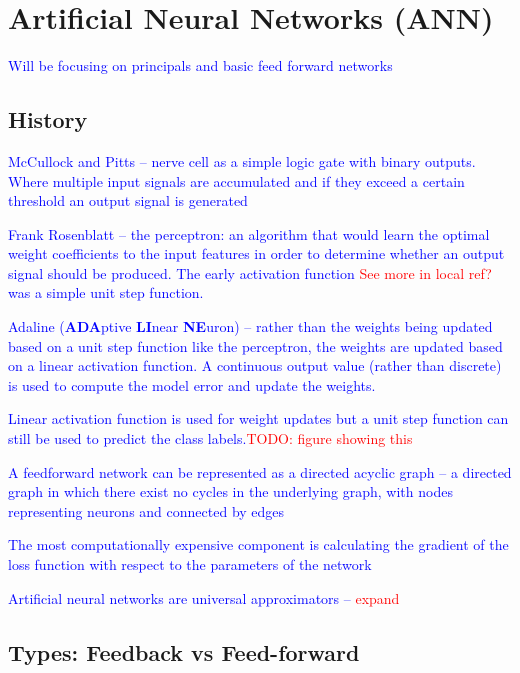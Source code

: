 \section{Artificial Neural Networks (ANN)}

\textcolor{blue}{Will be focusing on principals and basic feed forward networks}

\subsection{History}

\textcolor{blue}{McCullock and Pitts -- nerve cell as a simple logic gate with binary outputs.  Where multiple input signals are accumulated and if they exceed a certain threshold an output signal is generated}

\textcolor{blue}{Frank Rosenblatt -- the perceptron: an algorithm that would learn the optimal weight coefficients to the input features in order to determine whether an output signal should be produced. The early activation function \textcolor{red}{See more in local ref?} was a simple unit step function.}

\textcolor{blue}{Adaline (\textbf{ADA}ptive \textbf{LI}near \textbf{NE}uron) -- rather than the weights being updated based on a unit step function like the perceptron, the weights are updated based on a linear activation function. A continuous output value (rather than discrete) is used to compute the model error and update the weights.}

\textcolor{blue}{Linear activation function is used for weight updates but a unit step function can still be used to predict the class labels.\textcolor{red}{TODO: figure showing this}}

\textcolor{blue}{A feedforward network can be represented as a directed acyclic graph -- a directed graph in which there exist no cycles in the underlying graph, with nodes representing neurons and connected by edges}

\textcolor{blue}{The most computationally expensive component is calculating the gradient of the loss function with respect to the parameters of the network}

\textcolor{blue}{Artificial neural networks are {universal approximators} -- \textcolor{red}{expand}}

\subsection{Types: Feedback vs Feed-forward}

